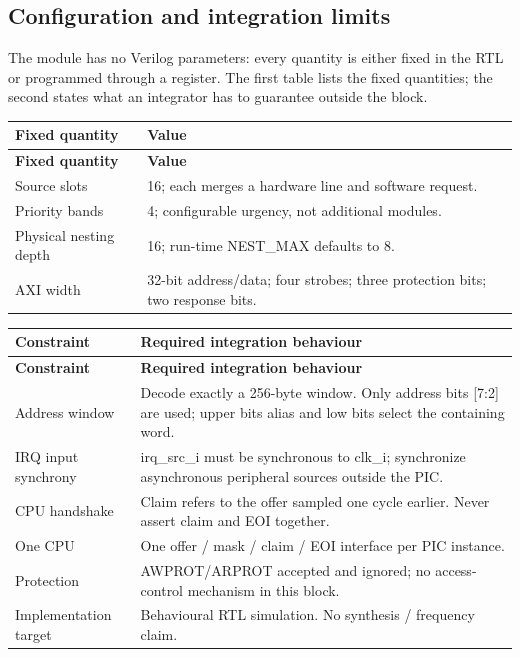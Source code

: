 \documentclass[11pt]{article}
\begin{document}
\subsection{Configuration and integration limits}
\noindent The module has no Verilog parameters: every quantity is either fixed in the RTL or programmed through a register. The first table lists the fixed quantities; the second states what an integrator has to guarantee outside the block.\par\medskip
{\small
\begin{longtable}{@{}L{0.3500\dimexpr\linewidth-12pt\relax}L{0.6500\dimexpr\linewidth-12pt\relax}@{}}
\toprule
\textbf{Fixed quantity} & \textbf{Value} \\ \midrule
\endfirsthead
\toprule
\textbf{Fixed quantity} & \textbf{Value} \\ \midrule
\endhead
Source slots & 16; each merges a hardware line and software request. \\ \addlinespace[3pt]
Priority bands & 4; configurable urgency, not additional modules. \\ \addlinespace[3pt]
Physical nesting depth & 16; run-time NEST\_MAX defaults to 8. \\ \addlinespace[3pt]
AXI width & 32-bit address/data; four strobes; three protection bits; two response bits. \\*
\bottomrule\end{longtable}}
{\small
\begin{longtable}{@{}L{0.2600\dimexpr\linewidth-12pt\relax}L{0.7400\dimexpr\linewidth-12pt\relax}@{}}
\toprule
\textbf{Constraint} & \textbf{Required integration behaviour} \\ \midrule
\endfirsthead
\toprule
\textbf{Constraint} & \textbf{Required integration behaviour} \\ \midrule
\endhead
Address window & Decode exactly a 256-byte window. Only address bits [7:2] are used; upper bits alias and low bits select the containing word. \\ \addlinespace[3pt]
IRQ input synchrony & irq\_src\_i must be synchronous to clk\_i; synchronize asynchronous peripheral sources outside the PIC. \\ \addlinespace[3pt]
CPU handshake & Claim refers to the offer sampled one cycle earlier. Never assert claim and EOI together. \\ \addlinespace[3pt]
One CPU & One offer / mask / claim / EOI interface per PIC instance. \\ \addlinespace[3pt]
Protection & AWPROT/ARPROT accepted and ignored; no access-control mechanism in this block. \\ \addlinespace[3pt]
Implementation target & Behavioural RTL simulation. No synthesis / frequency claim. \\*
\bottomrule\end{longtable}}
\end{document}
